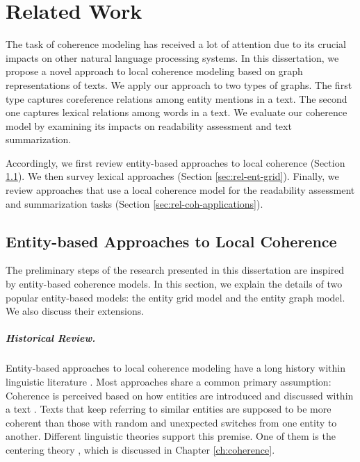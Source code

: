 
\chapter{Related Work}
\label{ch:rel-work}

The task of coherence modeling has received a lot of attention due to its crucial impacts on other natural language processing systems. 
In this dissertation, we propose a novel approach to local coherence modeling based on graph representations of texts. 
We apply our approach to two types of graphs.  
The first type captures coreference relations among entity mentions in a text. 
The second one captures lexical relations among words in a text.  
We evaluate our coherence model by examining its impacts on readability assessment and text summarization. 

Accordingly, we first review entity-based approaches to local coherence (Section \ref{sec:rel-entity-models}). 
We then survey lexical approaches (Section \ref{sec:rel-ent-grid}). 
Finally, we review approaches that use a local coherence model for the readability assessment and summarization tasks (Section \ref{sec:rel-coh-applications}). 

\section{Entity-based Approaches to Local Coherence}
\label{sec:rel-entity-models}

The preliminary steps of the research presented in this dissertation are inspired by entity-based coherence models. 
In this section, we explain the details of two popular entity-based models: the entity grid model and the entity graph model. 
We also discuss their extensions.  

\paragraph{Historical Review.} 



Entity-based approaches to local coherence modeling have a long history within linguistic literature \cite{kuno72,halliday76,prince81a,joshi98}.
Most approaches share a common primary assumption: Coherence is perceived based on how entities are introduced and discussed within a text \cite{barzilay08}. 
Texts that keep referring to similar entities are supposed to be more coherent than those with random and unexpected switches from one entity to another. 
Different linguistic theories support this premise. 
One of them is the centering theory \cite{grosz95,joshi98}, which is discussed in Chapter \ref{ch:coherence}. 

